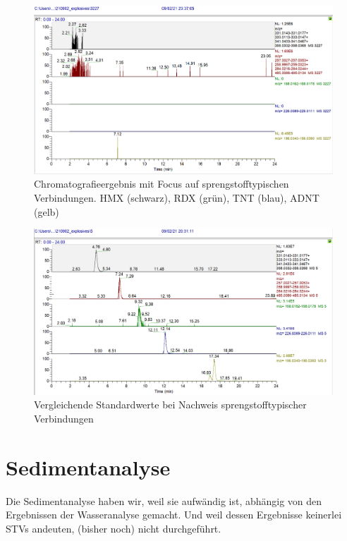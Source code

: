 \begin{figure}[htb!]
\includegraphics[height=\textheight,%
                   width=\textwidth,%
                   keepaspectratio]{Bilder/Explosives_3227_SampleW1.PNG}
\caption{Chromatografieergebnis mit Focus auf sprengstofftypischen Verbindungen. HMX (schwarz), RDX (grün), TNT (blau), ADNT (gelb)}
\end{figure}

\begin{figure}[htb!]
\includegraphics[height=\textheight,%
                   width=\textwidth,%
                   keepaspectratio]{Bilder/Explosives_5ppb.PNG}
\caption{Vergleichende Standardwerte bei Nachweis sprengstofftypischer Verbindungen}
\end{figure}

\section{Sedimentanalyse}
Die Sedimentanalyse haben wir, weil sie aufwändig ist, abhängig von den Ergebnissen der Wasseranalyse gemacht. Und weil dessen Ergebnisse keinerlei STVs andeuten, (bisher noch) nicht durchgeführt.

